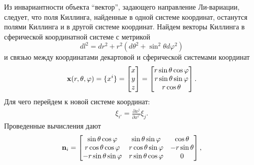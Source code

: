 \documentclass[12pt,a4paper]{article}
\begin{document}
            Из инвариантности объекта \enquote{вектор}, задающего направление Ли-вариации, следует, что поля Киллинга, найденные в одной системе координат, останутся полями Киллинга и в другой системе координат. Найдем векторы Киллинга в сферической координатной системе с метрикой
            \begin{equation}
                dl^2 = dr^2 + r^2 (d\theta^2 + \sin ^2 \theta d\varphi^2)
            \end{equation}
            и связью между координатами декартовой и сферической системами координат
            \begin{equation}
                \mathbf{x}(r, \theta, \varphi)
                =
                \{x^i\}
                =
                \begin{bmatrix}
                    x \\ y \\ z
                \end{bmatrix}
                =
                \begin{bmatrix}
                    r \sin\theta \cos\varphi \\
                    r \sin\theta \sin\varphi \\
                    r \cos\theta
                \end{bmatrix}
                .
            \end{equation}
            Для чего перейдем к новой системе координат:
            \begin{equation}\begin{aligned}
                \xi_{i'} = \frac{\partial x^j}{\partial x^{i'}} \xi_j.
            \end{aligned}\end{equation}
            Проведенные вычисления дают
            \begin{equation}
                \mathbf{n}_i
                =
                \begin{bmatrix}
                    \sin\theta \cos\varphi     & \sin\theta \sin\varphi   & \cos\theta \\
                    r \cos\theta \cos\varphi   & r \cos\theta \sin\varphi & - r \sin\theta \\
                    - r \sin\theta \sin\varphi & r \sin\theta \cos\varphi & 0
                \end{bmatrix}
                ,
            \end{equation}
\end{document}
